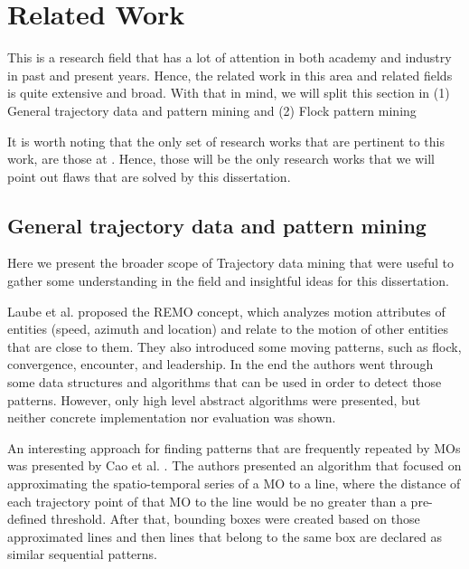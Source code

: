 \chapter{Related Work}
\label{chp:relatedwork}
This is a research field that has a lot of attention in both academy and industry in past and present years. Hence, the
related work in this area and related fields is quite extensive and broad. With that in mind, we will split this section
in (1) General trajectory data and pattern mining and (2) Flock pattern mining

It is worth noting that the only set of research works that are pertinent to this work, are those at
. Hence, those will be the only research works that we will point out flaws that are solved by
this dissertation.

\section{General trajectory data and pattern mining}
\label{sec:rel_general}
Here we present the broader scope of Trajectory data mining that were useful to gather some understanding in the field
and insightful ideas for this dissertation.

Laube et al. \citep{remo} proposed the REMO concept, which analyzes motion attributes of entities
(speed, azimuth and location) and relate to the motion of other entities that are close to them. They also introduced
some moving patterns, such as flock, convergence, encounter, and leadership. In the end the authors went through some
data structures and algorithms that can be used in order to detect those patterns. However, only high level abstract
algorithms were presented, but neither concrete implementation nor evaluation was shown.

An interesting approach for finding patterns that are frequently repeated by MOs was presented by Cao et al.
\citep{frequentpatterns}. The authors presented an algorithm that focused on approximating the spatio-temporal series
of a MO to a line, where the distance of each trajectory point of that MO to the line would be no greater than a
pre-defined threshold. After that, bounding boxes were created based on those approximated lines and then lines that
belong to the same box are declared as similar sequential patterns.

